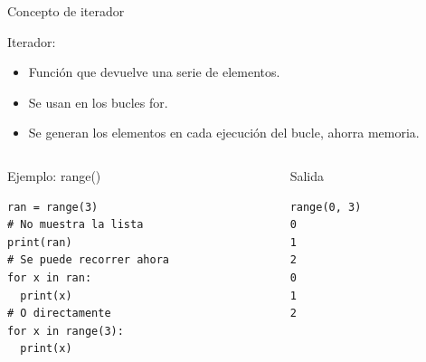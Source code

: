 \documentclass[bigger,unknownkeysallowed]{beamer}
\begin{document}
\begin{frame}[fragile,label={sec:org822a48a}]{Concepto de iterador}
 \begin{block}{Iterador:}
\begin{itemize}
\item Función que devuelve una serie de elementos.

\item Se usan en los bucles for.

\item Se generan los elementos en cada ejecución del bucle, ahorra memoria.
\end{itemize}
\end{block}

\begin{columns}
\begin{column}{0.5\columnwidth}
\begin{exampleblock}{Ejemplo: range()}
\begin{verbatim}
ran = range(3)
# No muestra la lista
print(ran)
# Se puede recorrer ahora
for x in ran:
  print(x)
# O directamente
for x in range(3):
  print(x)
\end{verbatim}
\end{exampleblock}
\end{column}
\begin{column}{0.5\columnwidth}
\begin{block}{Salida}
\scriptsize
\begin{verbatim}
range(0, 3)
0
1
2
0
1
2
\end{verbatim}
\end{block}
\end{column}
\end{columns}
\end{frame}
\end{document}
